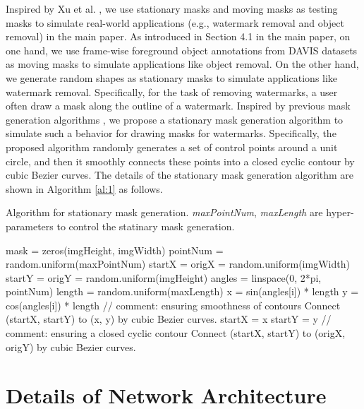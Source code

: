 \documentclass[runningheads]{llncs}
\begin{document}
Inspired by Xu et al. \cite{xu2019deep}, we use stationary masks and moving masks as testing masks to simulate real-world applications (e.g., watermark removal and object removal) in the main paper. 
As introduced in Section 4.1 in the main paper, on one hand, we use frame-wise foreground object annotations from DAVIS datasets \cite{caelles20182018} as moving masks to simulate applications like object removal. 
On the other hand, we generate random shapes as stationary masks to simulate applications like watermark removal. Specifically, for the task of removing watermarks, a user often draw a mask along the outline of a watermark. 
Inspired by previous mask generation algorithms \cite{chang2019free,yu2019free}, we propose a stationary mask generation algorithm to simulate such a behavior for drawing masks for watermarks. 
Specifically, the proposed algorithm randomly generates a set of control points around a unit circle, and then it smoothly connects these points into a closed cyclic contour by cubic Bezier curves. The details of the stationary mask generation algorithm are shown in Algorithm \ref{al:1} as follows.


\begin{algorithm}
   \caption{Algorithm for stationary mask generation. \textsl{maxPointNum}, \textsl{maxLength} are hyper-parameters to control the statinary mask generation.}
   \label{al:1}
   \begin{algorithmic}
      \STATE mask = zeros(imgHeight, imgWidth)
      \STATE pointNum = random.uniform(maxPointNum)
      \STATE startX = origX = random.uniform(imgWidth)
      \STATE startY = origY = random.uniform(imgHeight)
      \STATE angles = linspace(0, 2*pi, pointNum)
      \STATE length = random.uniform(maxLength)
      \STATE x = sin(angles[i]) * length
      \STATE y = cos(angles[i]) * length 
      \STATE // comment: ensuring smoothness of contours
      \STATE Connect (startX, startY) to (x, y) by cubic Bezier curves. 
      \STATE startX = x 
      \STATE startY = y 
      \ENDFOR
      \STATE // comment: ensuring a closed cyclic contour
      \STATE Connect (startX, startY) to (origX, origY) by cubic Bezier curves. 
   \end{algorithmic}
\end{algorithm}




\section{Details of Network Architecture}
\label{sec:net}
\end{document}
